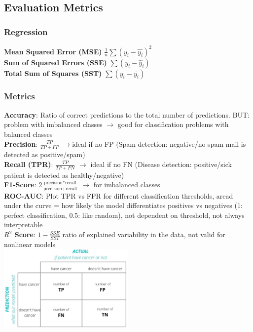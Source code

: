 \documentclass[english, threecolumn]{latex4ei/latex4ei_sheet}
\begin{document}
\begin{sectionbox}
\subsection{Evaluation Metrics}
\subsubsection{Regression}
\textbf{Mean Squared Error (MSE)} $\frac{1}{n}\sum (y_i - \hat{y_i})^2$\\
\textbf{Sum of Squared Errors (SSE)} $\sum (y_i - \hat{y_i})$\\
\textbf{Total Sum of Squares (SST)} $\sum (y_i - \overline{y_i})$\\

\subsubsection{Metrics}
\textbf{Accuracy}: Ratio of correct predictions to the total number of predictions. BUT: problem with imbalanced classes $\rightarrow$ good for classification problems with balanced classes\\
\textbf{Precision}: $\frac{TP}{TP+FP}$ $\rightarrow$ideal if no FP (Spam detection: negative/no-spam mail is detected as positive/spam)\\
\textbf{Recall (TPR)}: $\frac{TP}{TP+FN}$ $\rightarrow$ ideal if no FN (Disease detection: positive/sick patient is detected as healthy/negative)\\
\textbf{F1-Score}: $2\frac{\text{precision} * \text{recall}}{\text{precision} + \text{recall}}$ $\rightarrow$ for imbalanced classes\\
\textbf{ROC-AUC}: Plot TPR vs FPR for different classification thresholds, aread under the curve = how likely the model differentiates positives vs negatives (1: perfect classification, 0.5: like random), not dependent on threshold, not always interpretable\\
\textbf{$R^2$ Score}: $1-\frac{SSE}{SST}$ ratio of explained variability in the data, not valid for nonlinear models \\


\includegraphics[width=0.5\textwidth]{cheat_sheets/img/confusion.jpeg}

\end{sectionbox}
\end{document}
